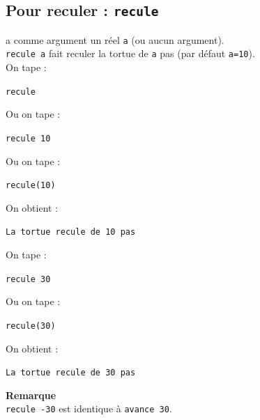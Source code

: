\documentclass[a4paper,11pt]{book}
\begin{document}
\subsection{Pour reculer : {\tt recule}}
 a comme argument un r\'eel {\tt a} (ou aucun argument).\\
{\tt recule a} fait reculer la tortue de {\tt a} pas (par d\'efaut {\tt a=10}).\\
On tape :
\begin{center}{\tt recule}\end{center}
Ou on tape :
\begin{center}{\tt recule 10}\end{center}
Ou on tape :
\begin{center}{\tt recule(10)}\end{center}
On obtient :
\begin{center}{\tt La tortue recule de 10 pas}\end{center}
On tape :
\begin{center}{\tt recule 30}\end{center}
Ou on tape :
\begin{center}{\tt recule(30)}\end{center}
On obtient :
\begin{center}{\tt La tortue recule de 30 pas}\end{center}
{\bf Remarque}\\
{\tt recule -30} est identique \`a {\tt avance 30}.
\end{document}
